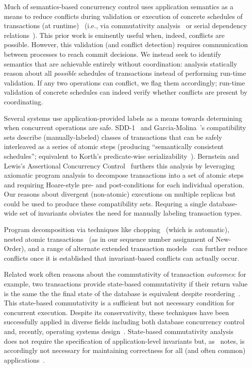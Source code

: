 Much of semantics-based concurrency control uses application semantics
as a means to reduce conflicts during validation or execution of
concrete schedules of transactions (at
runtime)~\cite{badrinath-semantics} (i.e., via commutativity
analysis~\cite{weihl-thesis} or serial dependency
relations~\cite{herlihy-apologizing}). This prior work is eminently
useful when, indeed, conflicts are possible. However, this validation
(and conflict detection) requires communication between processes to
reach commit decisions. We instead seek to identify semantics that are
achievable entirely without coordination: \iconfluence analysis
statically reason about all \textit{possible} schedules of
transactions instead of performing run-time validation. If any two
operations can conflict, we flag them accordingly; run-time validation
of concrete schedules can indeed verify whether conflicts are present
by coordinating.

Several systems use application-provided labels as a means towards
determining when concurrent operations are safe. SDD-1~\cite{sdd1} and
Garcia-Molina~\cite{garciamolina-semantics}'s compatibility
  sets describe (manually-labeled) classes of transactions that can
be safely interleaved as a series of atomic steps (producing
``semantically consistent schedules''; equivalent to Korth's
predicate-wise
serializability~\cite{korth-serializability}). Bernstein and Lewis's
Assertional Concurrency Control~\cite{decomp-semantics}
furthers this analysis by leveraging axiomatic program analysis to
decompose transactions into a set of atomic steps and requiring
Hoare-style pre- and post-conditions for each individual
operation. Our \iconfluence reasons about divergent (non-atomic)
executions on multiple replicas but could be used to produce these
compatibility sets. Requring a single database-wide set of invariants
obviates the need for manually labeling transaction types.

Program decomposition via techniques like chopping~\cite{chopping}
(which is automatic), nested atomic
transactions~\cite{atomictransactions} (as in our sequence number
assignment of New-Order), and a range of alternate extended
  transaction models~\cite{acta} can further reduce conflicts once it
is established that invariant-based conflicts can actually occur.

 Related work often reasons about
the commutativity of transaction \textit{outcomes}: for example, two
transactions provide state-based commutativity if their return value
is the same the the final state of the database is equivalent despite
reordering~\cite{weihl-data,weihl-thesis}. This state-based
commutativity is a sufficient but not necessary condition for
concurrent execution. Despite its conservativity, these techniques
have been successfully applied in diverse fields including both
database concurrency control and, recently, operating systems
design~\cite{kohler-commutativity}. State-based commutativity analysis
does not require the specification of application-level invariants
but, as~\cite{kohler-commutativity} notes, is accordingly not
necessary for maintaining correctness for all (and often common)
applications~\cite{lamport-audit}.

